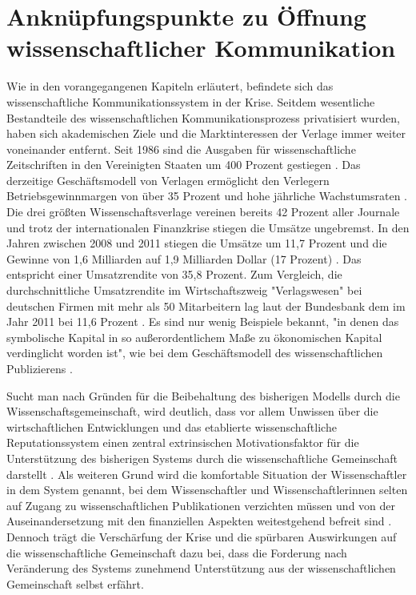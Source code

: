 \section{Anknüpfungspunkte zu Öffnung wissenschaftlicher Kommunikation}

Wie in den vorangegangenen Kapiteln erläutert, befindete sich das wissenschaftliche Kommunikationssystem in der Krise. Seitdem wesentliche Bestandteile des wissenschaftlichen Kommunikationsprozess privatisiert wurden, haben sich akademischen Ziele und die Marktinteressen der Verlage immer weiter voneinander entfernt. Seit 1986 sind die Ausgaben für wissenschaftliche Zeitschriften in den Vereinigten Staaten um 400 Prozent gestiegen \cite{suchen_ARL_Statistics_2010-11 Momograph_Serial_Costs_in_Libraries}. Das derzeitige Geschäftsmodell von Verlagen ermöglicht den Verlegern Betriebsgewinnmargen von über 35 Prozent \cite{russell_2008_business} \cite{cope2014future} und hohe jährliche Wachstumsraten \cite{Martin_2013} \cite{Wellcome_Trust_2003}. Die drei größten Wissenschaftsverlage vereinen bereits 42 Prozent aller Journale und trotz der internationalen Finanzkrise stiegen die Umsätze ungebremst. In den Jahren zwischen 2008 und 2011 stiegen die Umsätze um 11,7 Prozent und die Gewinne von 1,6 Milliarden auf 1,9 Milliarden Dollar (17 Prozent) \cite{cope2014future}. Das entspricht einer Umsatzrendite von 35,8 Prozent. Zum Vergleich, die durchschnittliche Umsatzrendite im Wirtschaftszweig "Verlagswesen" bei deutschen Firmen mit mehr als 50 Mitarbeitern lag laut der Bundesbank dem im Jahr 2011 bei 11,6 Prozent \cite{bundesbank_2014}. Es sind nur wenig Beispiele bekannt, "in denen das symbolische Kapital in so außerordentlichem Maße zu ökonomischen Kapital verdinglicht worden ist", wie bei dem Geschäftsmodell des wissenschaftlichen Publizierens \cite{hagner_2015_sache_buches}.

Sucht man nach Gründen für die Beibehaltung des bisherigen Modells durch die Wissenschaftsgemeinschaft, wird deutlich, dass vor allem Unwissen über die wirtschaftlichen Entwicklungen und das etablierte wissenschaftliche Reputationssystem einen zentral extrinsischen Motivationsfaktor für die Unterstützung des bisherigen Systems durch die wissenschaftliche Gemeinschaft darstellt \cite{minssen_2012_arbeit}. Als weiteren Grund wird die komfortable Situation der Wissenschaftler in dem System genannt, bei dem Wissenschaftler und Wissenschaftlerinnen selten auf Zugang zu wissenschaftlichen Publikationen verzichten müssen und von der Auseinandersetzung mit den finanziellen Aspekten weitestgehend befreit sind \cite{herb_2010} \cite{Sietmann_oa_2007} \cite{hanekop_2006}. Dennoch trägt die Verschärfung der Krise und die spürbaren Auswirkungen auf die wissenschaftliche Gemeinschaft dazu bei, dass die Forderung nach Veränderung des Systems zunehmend Unterstützung aus der wissenschaftlichen Gemeinschaft selbst erfährt.

